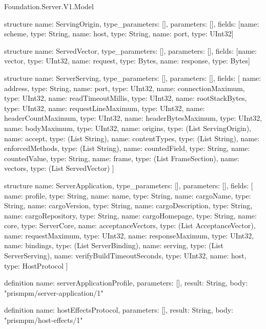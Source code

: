 \begin{lexlean}{Foundation.Server.V1.Model}
\begin{semanticmodule}
structure{
  name: ServingOrigin,
  type_parameters: [],
  parameters: [],
  fields: [{name: scheme, type: String}, {name: host, type: String}, {name: port, type: UInt32}]
}

structure{
  name: ServedVector,
  type_parameters: [],
  parameters: [],
  fields: [{name: vector, type: UInt32}, {name: request, type: Bytes}, {name: response, type: Bytes}]
}

structure{
  name: ServerServing,
  type_parameters: [],
  parameters: [],
  fields: [
    {name: address, type: String},
    {name: port, type: UInt32},
    {name: connectionMaximum, type: UInt32},
    {name: readTimeoutMillis, type: UInt32},
    {name: rootStackBytes, type: UInt32},
    {name: requestLineMaximum, type: UInt32},
    {name: headerCountMaximum, type: UInt32},
    {name: headerBytesMaximum, type: UInt32},
    {name: bodyMaximum, type: UInt32},
    {name: origins, type: (List ServingOrigin)},
    {name: accept, type: (List String)},
    {name: contentTypes, type: (List String)},
    {name: enforcedMethods, type: (List String)},
    {name: countedField, type: String},
    {name: countedValue, type: String},
    {name: frame, type: (List FrameSection)},
    {name: vectors, type: (List ServedVector)}
  ]
}

structure{
  name: ServerApplication,
  type_parameters: [],
  parameters: [],
  fields: [
    {name: profile, type: String},
    {name: name, type: String},
    {name: cargoName, type: String},
    {name: cargoVersion, type: String},
    {name: cargoDescription, type: String},
    {name: cargoRepository, type: String},
    {name: cargoHomepage, type: String},
    {name: core, type: ServerCore},
    {name: acceptanceVectors, type: (List AcceptanceVector)},
    {name: requestMaximum, type: UInt32},
    {name: responseMaximum, type: UInt32},
    {name: bindings, type: (List ServerBinding)},
    {name: serving, type: (List ServerServing)},
    {name: verifyBuildTimeoutSeconds, type: UInt32},
    {name: host, type: HostProtocol}
  ]
}

definition{
  name: serverApplicationProfile,
  parameters: [],
  result: String,
  body: "prismpm/server-application/1"
}

definition{
  name: hostEffectsProtocol,
  parameters: [],
  result: String,
  body: "prismpm/host-effects/1"
}
\end{semanticmodule}
\end{lexlean}
